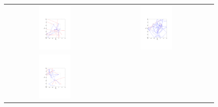 \documentclass{article} %
\begin{document}
\begin{figure}[t!]
\setlength{\tabcolsep}{0em}
\vspace{-1mm}
\begin{center}
\begin{tabular}{ccc}
\includegraphics[trim={3.2cm 6cm 3.2cm 9cm},clip,width=0.33\textwidth]{../plots3/BaselineHMC_l10_eps0_5_log_scatter2D.pdf} 
&\includegraphics[trim={3.2cm 6cm 3.2cm 9cm},clip,width=0.33\textwidth]{../plots3/ReflectiveHMC_l10_eps0_5_log_scatter2D.pdf} \\
\includegraphics[trim={3.2cm 6cm 3.2cm 9cm},clip,width=0.33\textwidth]{../plots3/BaselineHMC_l25_eps0_1_log_scatter2D.pdf} 

\end{tabular}
\end{center}
\end{figure}
\end{document}
